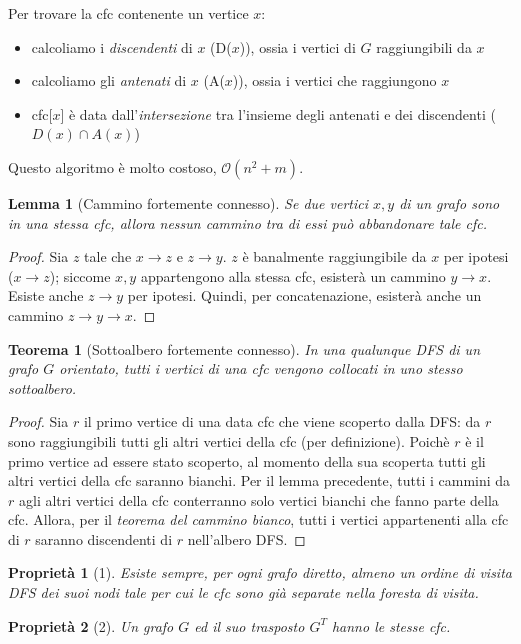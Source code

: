 \documentclass[11pt]{book}
\newtheorem*{theorem}{Teorema}
\newtheorem*{proprietà}{Proprietà}
\newtheorem*{lemma}{Lemma}
\begin{document}
Per trovare la cfc contenente un vertice $x$:
\begin{itemize}
    \item calcoliamo i \textit{discendenti} di $x$ (D($x$)), ossia i vertici di $G$ raggiungibili da $x$
    \item calcoliamo gli \textit{antenati} di $x$ (A($x$)), ossia i vertici che raggiungono $x$
    \item cfc[$x$] è data dall'\textit{intersezione} tra l'insieme degli antenati e dei discendenti ($D(x)\cap A(x)$)
\end{itemize}
Questo algoritmo è molto costoso, $\mathcal{O}(n^2+m)$.
\begin{lemma}[Cammino fortemente connesso]
    Se due vertici $x,y$ di un grafo sono in una stessa cfc, allora nessun cammino tra di essi può abbandonare tale cfc.
\end{lemma}
\begin{proof}
    Sia $z$ tale che $x\rightarrow z$ e $z\rightarrow y$. $z$ è banalmente raggiungibile da $x$ per ipotesi ($x\rightarrow z$); 
    siccome $x,y$ appartengono alla stessa cfc, esisterà un cammino $y\rightarrow x$. Esiste anche $z\rightarrow y$ per 
    ipotesi. Quindi, per concatenazione, esisterà anche un cammino $z\rightarrow y\rightarrow x$.
\end{proof}
\begin{theorem}[Sottoalbero fortemente connesso]
    In una qualunque DFS di un grafo $G$ orientato, tutti i vertici di una cfc vengono collocati in uno stesso sottoalbero.
\end{theorem}
\begin{proof}
    Sia $r$ il primo vertice di una data cfc che viene scoperto dalla DFS: da $r$ sono raggiungibili tutti gli altri vertici 
    della cfc (per definizione). Poichè $r$ è il primo vertice ad essere stato scoperto, al momento della sua scoperta tutti 
    gli altri vertici della cfc saranno bianchi. Per il lemma precedente, tutti i cammini da $r$ agli altri vertici della 
    cfc conterranno solo vertici bianchi che fanno parte della cfc. Allora, per il \textit{teorema del cammino bianco}, 
    tutti i vertici appartenenti alla cfc di $r$ saranno discendenti di $r$ nell'albero DFS.
\end{proof}
\begin{proprietà}[1]
    Esiste sempre, per ogni grafo diretto, almeno un ordine di visita DFS dei suoi nodi tale per cui le cfc sono già 
    separate nella foresta di visita.
\end{proprietà}
\begin{proprietà}[2]
    Un grafo $G$ ed il suo trasposto $G^T$ hanno le stesse cfc.
\end{proprietà}
\end{document}
